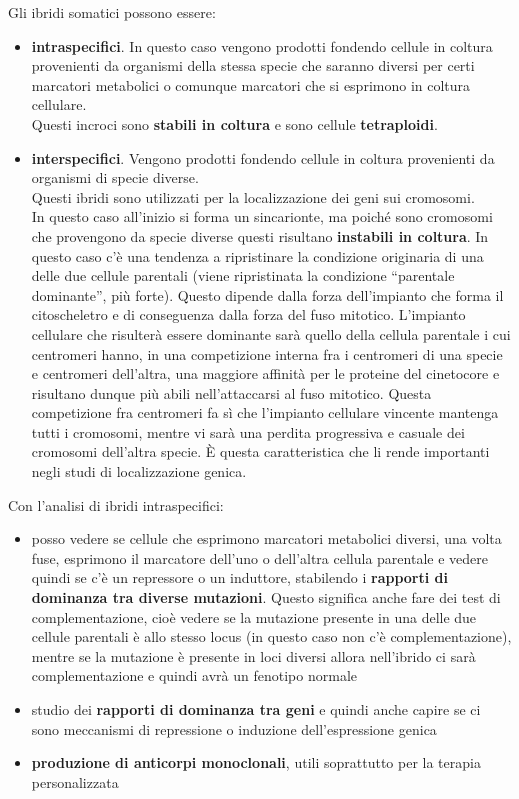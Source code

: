 \documentclass[11pt]{book}
\begin{document}
Gli ibridi somatici possono essere:
\begin{itemize}
\item \textbf{intraspecifici}. In questo caso vengono prodotti fondendo cellule in coltura provenienti da organismi della stessa specie che saranno diversi per certi marcatori metabolici o comunque marcatori che si esprimono in coltura cellulare.\\
Questi incroci sono \textbf{stabili in coltura} e sono cellule \textbf{tetraploidi}.

\item \textbf{interspecifici}. Vengono prodotti fondendo cellule in coltura provenienti da organismi di specie diverse.\\
Questi ibridi sono utilizzati per la localizzazione dei geni sui cromosomi.\\
In questo caso all’inizio si forma un sincarionte, ma poiché sono cromosomi che provengono da specie diverse questi risultano \textbf{instabili in coltura}. In questo caso c’è una tendenza a ripristinare la condizione originaria di una delle due cellule parentali (viene ripristinata la condizione ``parentale dominante'', più forte). Questo dipende dalla forza dell’impianto che forma il citoscheletro e di conseguenza dalla forza del fuso mitotico. L’impianto cellulare che risulterà essere dominante sarà quello della cellula parentale i cui centromeri hanno, in una competizione interna fra i centromeri di una specie e centromeri dell’altra, una maggiore affinità per le proteine del cinetocore e risultano dunque più abili nell’attaccarsi al fuso mitotico. Questa competizione fra centromeri fa sì che l’impianto cellulare vincente mantenga tutti i cromosomi, mentre vi sarà una perdita progressiva e casuale dei cromosomi dell’altra specie. È questa caratteristica che li rende importanti negli studi di localizzazione genica.
\end{itemize}

Con l’analisi di ibridi intraspecifici:
\begin{itemize}
\item posso vedere se cellule che esprimono marcatori metabolici diversi, una volta fuse, esprimono il marcatore dell’uno o dell’altra cellula parentale e vedere quindi se c’è un repressore o un induttore, stabilendo i \textbf{rapporti di dominanza tra diverse mutazioni}. Questo significa anche fare dei test di complementazione, cioè vedere se la mutazione presente in una delle due cellule parentali è allo stesso locus (in questo caso non c’è complementazione), mentre se la mutazione è presente in loci diversi allora nell’ibrido ci sarà complementazione e quindi avrà un fenotipo normale
\item studio dei \textbf{rapporti di dominanza tra geni} e quindi anche capire se ci sono meccanismi di repressione o induzione dell’espressione genica 
\item \textbf{produzione di anticorpi monoclonali}, utili soprattutto per la terapia personalizzata
\end{itemize}
\end{document}
